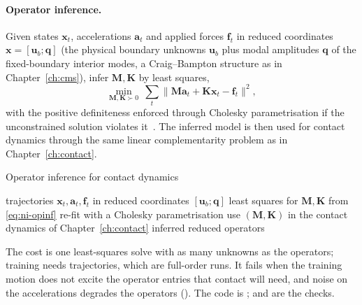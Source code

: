 
\paragraph{Operator inference.}
Given states $\bm x_t$, accelerations $\bm a_t$ and applied forces $\bm f_t$ in reduced coordinates $\bm x=[\bm u_b;\bm q]$ (the physical boundary unknowns $\bm u_b$ plus modal amplitudes $\bm q$ of the fixed-boundary interior modes, a Craig--Bampton structure as in Chapter~\ref{ch:cms}), infer $\bm M,\bm K$ by least squares,
\begin{equation}\label{eq:ni-opinf}
\min_{\bm M,\bm K\succ0}\ \sum_t\|\bm M\bm a_t+\bm K\bm x_t-\bm f_t\|^2,
\end{equation}
with the positive definiteness enforced through Cholesky parametrisation if the unconstrained solution violates it~\cite{peherstorfer2016opinf,manvelyan2025}. The inferred model is then used for contact dynamics through the same linear complementarity problem as in Chapter~\ref{ch:contact}.

\begin{algbox}{Operator inference for contact dynamics}
\begin{pseudo}
\Require trajectories $\bm x_t,\bm a_t,\bm f_t$ in reduced coordinates $[\bm u_b;\bm q]$
\State least squares for $\bm M,\bm K$ from \eqref{eq:ni-opinf}
  \State re-fit with a Cholesky parametrisation 
\EndIf
\State use $(\bm M,\bm K)$ in the contact dynamics of Chapter~\ref{ch:contact}
\Ensure inferred reduced operators
\end{pseudo}
\end{algbox}

The cost is one least-squares solve with as many unknowns as the operators; training needs trajectories, which are full-order runs. It fails when the training motion does not excite the operator entries that contact will need, and noise on the accelerations degrades the operators (). The code is ;  and  are the checks.


